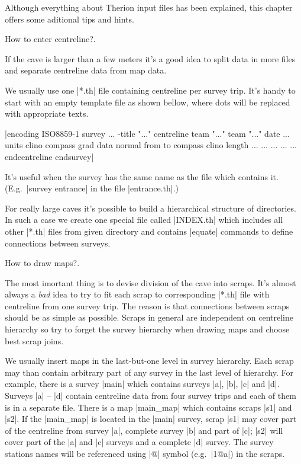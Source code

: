 Although everything about Therion input files has been explained, this chapter 
offers some aditional tips and hints.

\subsubchapter How to enter centreline?.

If the cave is larger than a few meters it's a good idea to split data in more 
files and separate centreline data from map data. 

We usually use one |*.th| file containing centreline per survey trip. 
It's handy to 
start with an empty template file as shown bellow, where dots will be replaced 
with appropriate texts.

|encoding ISO8859-1
survey ... -title "..."
  centreline
    team "..."
    team "..."
    date ...
    units clino compass grad
    data normal from to compass clino length
      ... ... ... ... ...
  endcentreline
endsurvey|

It's useful when the survey has the same name as the file which contains it. 
(E.g.~|survey entrance| in the file |entrance.th|.)

For really large caves it's possible to build a hierarchical structure of 
directories. In such a case we create one special file called |INDEX.th| which 
includes all other |*.th| files from given directory and contains |equate| 
commands to define connections between surveys.

\subsubchapter How to draw maps?.

The most imortant thing is to devise division of the cave into scraps. 
It's almost always a {\it bad\/} idea to try to fit each scrap to corresponding
|*.th| file with centreline from one survey trip. The reason is that 
connections between scraps should be as simple as possible. 
Scraps in general are independent on centreline hierarchy so try to forget
the survey hierarchy when drawing maps and choose best scrap joins. 

We usually insert maps in the last-but-one level in survey hierarchy. Each 
scrap may than contain arbitrary part of any survey in the last level of 
hierarchy. For example, there is a survey |main| which contains surveys |a|, 
|b|, |c| and |d|. Surveys |a| -- |d| contain centreline data from four survey 
trips and each of them is in a separate file. There is a map |main_map| which 
contains scraps |s1| and |s2|. If the |main_map| is located in the |main| 
survey, scrap |s1| may cover part of the centreline from survey |a|, complete 
survey |b| and part of |c|; |s2| will cover part of the |a| and |c| surveys
and a complete |d| survey. The survey stations names will be referenced using 
|@| symbol (e.g.~|1@a|) in the scraps.

